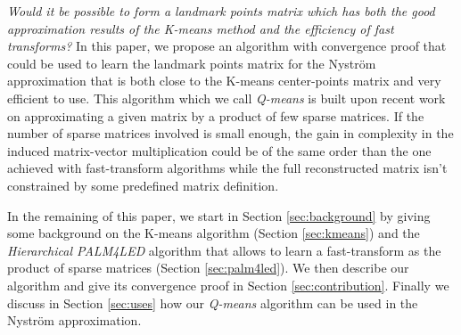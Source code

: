\textit{Would it be possible to form a landmark points matrix which has both the good approximation results of the K-means method and the efficiency of fast transforms?} In this paper, we propose an algorithm with convergence proof that could be used to learn the landmark points matrix for the Nyström approximation that is both close to the K-means center-points matrix and very efficient to use. This algorithm which we call \textit{Q-means} is built upon recent work \cite{magoarou2014learning} on approximating a given matrix by a product of few sparse matrices. If the number of sparse matrices involved is small enough, the gain in complexity in the induced matrix-vector multiplication could be of the same order than the one achieved with fast-transform algorithms while the full reconstructed matrix isn't constrained by some predefined matrix definition.

In the remaining of this paper, we start in Section \ref{sec:background} by giving some background on the K-means algorithm (Section \ref{sec:kmeans}) and the \textit{Hierarchical PALM4LED} algorithm that allows to learn a fast-transform as the product of sparse matrices (Section \ref{sec:palm4led}). We then describe our algorithm and give its convergence proof in Section \ref{sec:contribution}. Finally we discuss in Section \ref{sec:uses} how our \textit{Q-means} algorithm can be used in the Nyström approximation.
